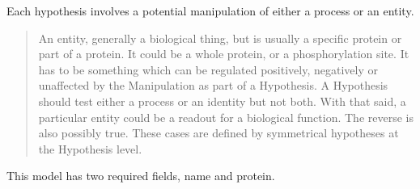 \documentclass[letterpaper,10pt,english]{sphinxmanual}
\begin{document}
\begin{fulllineitems}
\label{api:experimentdb.hypotheses.models.Entity}
Each hypothesis involves a potential manipulation of either a process or an entity.

\begin{quote}

An entity, generally a biological thing, but is usually a specific protein or part of a protein.  It could be a whole protein, or a phosphorylation site.  It has to be something which can be regulated positively, negatively or unaffected by the Manipulation as part of a Hypothesis.  A Hypothesis should test either a process or an identity but not both.  With that said, a particular entity could be a readout for a biological function.  The reverse is also possibly true.  These cases are defined by symmetrical hypotheses at the Hypothesis level.

\end{quote}

This model has two required fields, name and protein.


\begin{fulllineitems}
\label{api:experimentdb.hypotheses.models.Entity.DoesNotExist}
\end{fulllineitems}


\begin{fulllineitems}
\label{api:experimentdb.hypotheses.models.Entity.MultipleObjectsReturned}
\end{fulllineitems}


\begin{fulllineitems}
\label{api:experimentdb.hypotheses.models.Entity.hypothesis_set}
\end{fulllineitems}


\begin{fulllineitems}
\label{api:experimentdb.hypotheses.models.Entity.protein}
\end{fulllineitems}


\end{fulllineitems}
\end{document}
